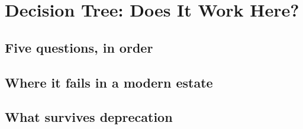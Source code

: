 \section{Decision Tree: Does It Work Here?}
\unwritten
\label{sec:synthesis}

\subsection{Five questions, in order}
\unwritten

\subsection{Where it fails in a modern estate}
\unwritten

\subsection{What survives deprecation}
\unwritten
